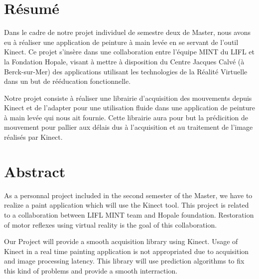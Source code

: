 \section*{Résumé}

Dans le cadre de notre projet individuel de semestre deux de Master, nous avons eu à réaliser une application de peinture à main levée en se servant de l'outil Kinect. Ce projet s'insère dans une collaboration entre l'équipe MINT du LIFL et la Fondation Hopale, visant à mettre à disposition du Centre Jacques Calvé (à Berck-sur-Mer) des applications utilisant les technologies de la Réalité Virtuelle dans un but de rééducation fonctionnelle. 

Notre projet consiste à réaliser une librairie d'acquisition des mouvements depuis Kinect et de l'adapter pour une utilisation fluide dans une application de peinture à main levée qui nous ait fournie. Cette librairie aura pour but la prédicition de mouvement pour pallier aux délais dus à l'acquisition et au traitement de l'image réalisés par Kinect.
\\

\section*{Abstract}

As a personnal project included in the second semester of the Master, we have to realize a paint application which will use the Kinect tool. This project is related to a collaboration between LIFL MINT team and Hopale foundation. Restoration of motor reflexes using virtual reality is the goal of this collaboration.

Our Project will provide a smooth acquisition library using Kinect. Usage of Kinect in a real time painting application is not appropriated due to acquisition and image processing latency. This library will use prediction algorithms to fix this kind of problems and provide a smooth interraction.

\thispagestyle{empty}
\newpage
